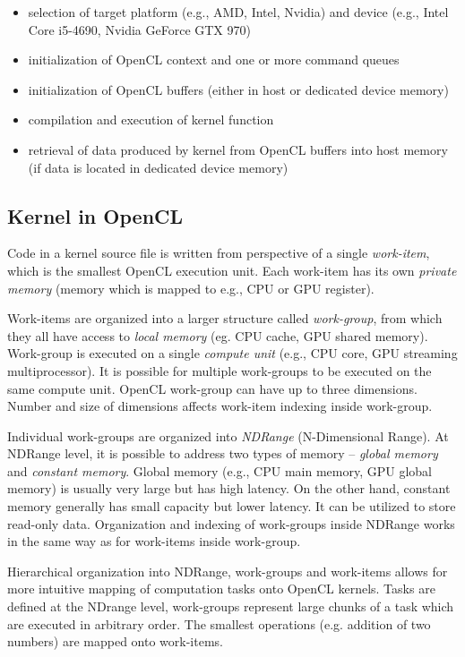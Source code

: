 \documentclass
[
    digital, %
    oneside, %
    table, %
    nolof, %
    nolot, %
    nocover %
]{fithesis3}
\begin{document}
\begin{itemize}
    \item selection of target platform (e.g., AMD, Intel, Nvidia) and device (e.g., Intel Core i5-4690, Nvidia GeForce GTX 970)
    \item initialization of OpenCL context and one or more command queues
    \item initialization of OpenCL buffers (either in host or dedicated device memory)
    \item compilation and execution of kernel function
    \item retrieval of data produced by kernel from OpenCL buffers into host memory (if data is located in dedicated device memory)
\end{itemize}

\subsection{Kernel in OpenCL}
Code in a kernel source file is written from perspective of a single \textit{work-item}, which is the smallest OpenCL execution unit. Each work-item
has its own \textit{private memory} (memory which is mapped to e.g., CPU or GPU register).

Work-items are organized into a larger structure called \textit{work-group}, from which they all have access to \textit{local memory} (eg. CPU cache,
GPU shared memory). Work-group is executed on a single \textit{compute unit} (e.g., CPU core, GPU streaming multiprocessor). It is possible for
multiple work-groups to be executed on the same compute unit. OpenCL work-group can have up to three dimensions. Number and size of dimensions affects
work-item indexing inside work-group.

Individual work-groups are organized into \textit{NDRange} (N-Dimensional Range). At NDRange level, it is possible to address two types of memory --
\textit{global memory} and \textit{constant memory}. Global memory (e.g., CPU main memory, GPU global memory) is usually very large but has high
latency. On the other hand, constant memory generally has small capacity but lower latency. It can be utilized to store read-only data. Organization
and indexing of work-groups inside NDRange works in the same way as for work-items inside work-group.

Hierarchical organization into NDRange, work-groups and work-items allows for more intuitive mapping of computation tasks onto OpenCL kernels. Tasks
are defined at the NDrange level, work-groups represent large chunks of a task which are executed in arbitrary order. The smallest operations (e.g.
addition of two numbers) are mapped onto work-items.
\end{document}

